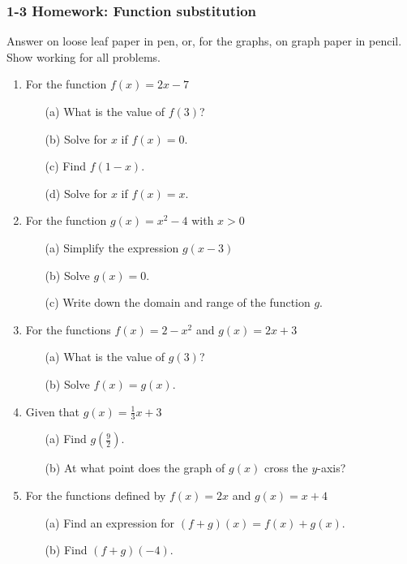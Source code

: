 \documentclass[12pt, oneside]{article}
\begin{document}
\subsubsection*{1-3 Homework: Function substitution}
Answer on loose leaf paper in pen, or, for the graphs, on graph paper in pencil. Show working for all problems.

\begin{enumerate}

\item For the function $f(x) = 2x-7$
\begin{itemize}
  \item[(a)] What is the value of $f(3)$?
	\item[(b)] Solve for $x$ if $f(x)=0$.
	\item[(c)] Find  $f(1-x)$.
	\item[(d)] Solve for $x$ if $f(x)=x$.
\end{itemize}

\item For the function $g(x) = x^2-4$ with $x>0$
\begin{itemize}
  \item[(a)] Simplify the expression $g(x-3)$
	\item[(b)] Solve $g(x)=0$.
  \item[(c)] Write down the domain and range of the function $g$.
\end{itemize}

\item For the functions $f(x) = 2-x^2$ and $g(x) = 2x+3$
\begin{itemize}
  \item[(a)] What is the value of $g(3)$?
	\item[(b)] Solve $f(x)=g(x)$.
\end{itemize}

\item Given that $g(x) = \frac {1}{3} x+3$
\begin{itemize}
  \item[(a)] Find $g(\frac{9}{2})$.
	\item[(b)] At what point does the graph of $g(x)$ cross the $y$-axis?
\end{itemize}

\item For the functions defined by $f(x) = 2x$ and $g(x) = x+4$
\begin{itemize}
  \item[(a)] Find an expression for $(f+g)(x)=f(x)+g(x)$.
	\item[(b)] Find $(f+g)(-4)$.
\end{itemize}


\end{enumerate}
\end{document}
